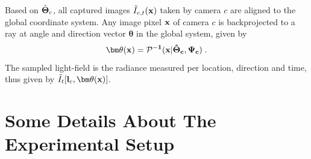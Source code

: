 \documentclass[runningheads]{llncs}
\begin{document}
Based on $\hat{\bf \Theta}_c$, all captured images $\tilde I_{c,t}(\bf x)$ taken by camera $c$ are aligned to the global coordinate system. Any image pixel ${\bf x}$ of camera $c$ is backprojected to a ray at angle and direction vector ${\bm \theta}$ in the global system, given by
\begin{equation}
 {\bm \theta}(\bf x)={\cal P}^{-1}({\bf x}|\hat{\bf \Theta}_c,\Psi_c)
  \;.
 \label{eq:thetac}
\end{equation}
The sampled light-field is the radiance measured per location, direction and time, thus given by
$\tilde I_t[{\bf l}_c,{\bm \theta}(\bf x)]$.

\section{Some Details About The Experimental Setup}
\label{sec:muticalib}
\end{document}
